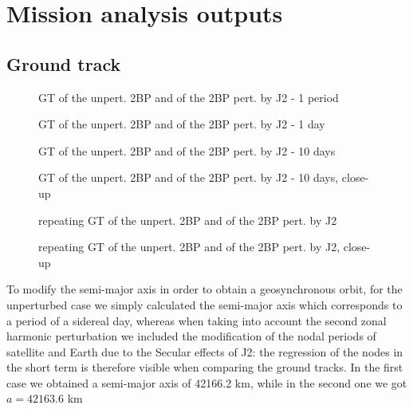 \documentclass[11pt,a4paper]{report}
\begin{document}
\chapter{Mission analysis outputs}

\section{Ground track}
\begin{figure}[H]
\centering
{}
\caption{GT of the unpert. 2BP and of the 2BP pert. by J2 - 1 period}
\end{figure}
\begin{figure}[H]
\centering
{}
\caption{GT of the unpert. 2BP and of the 2BP pert. by J2 - 1 day}
\end{figure}
\begin{figure}[H]
\centering
{}
\caption{GT of the unpert. 2BP and of the 2BP pert. by J2 - 10 days}
\end{figure}
\begin{figure}[H]
\centering
{}
\caption{GT of the unpert. 2BP and of the 2BP pert. by J2 - 10 days, close-up}
\end{figure}
\begin{figure}[H]
\centering
{}
\caption{repeating GT of the unpert. 2BP and of the 2BP pert. by J2}
\end{figure}
\begin{figure}[H]
\centering
{}
\caption{repeating GT of the unpert. 2BP and of the 2BP pert. by J2, close-up}
\end{figure}

To modify the semi-major axis in order to obtain a geosynchronous orbit, for the unperturbed case we simply calculated the semi-major axis which corresponds to a period of a sidereal day, whereas when taking into account the second zonal harmonic perturbation we included the modification of the nodal periods of satellite and Earth due to the Secular effects of J2: the regression of the nodes in the short term is therefore visible when comparing the ground tracks.
In the first case we obtained a semi-major axis of 42166.2 km, while in the second one we got $a = 42163.6$ km
\end{document}
